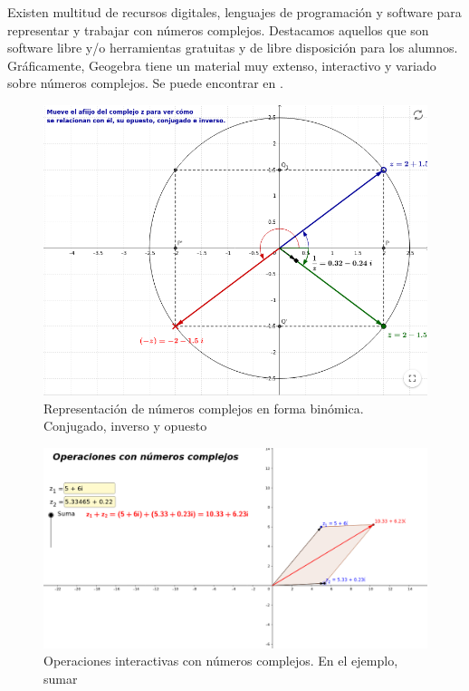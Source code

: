 \documentclass[../main.tex]{memoir}
\begin{document}
Existen multitud de recursos digitales, lenguajes de programación y software para representar y trabajar con números complejos. Destacamos aquellos que son software libre y/o herramientas gratuitas y de libre disposición para los alumnos. Gráficamente, Geogebra tiene un material muy extenso, interactivo y variado sobre números complejos. Se puede encontrar en \cite{materialgeogebra}.

\begin{figure}[H]
	\centering
	\includegraphics[scale=0.3]{images/conjugado.png}
	\caption{Representación de números complejos en forma binómica. Conjugado, inverso y opuesto}
	\label{geogebra1}
\end{figure}

\begin{figure}[H]
	\centering
	\includegraphics[scale=0.25]{images/sumar.png}
	\caption{Operaciones interactivas con números complejos. En el ejemplo, sumar}
	\label{geogebra2}
\end{figure}
\end{document}
